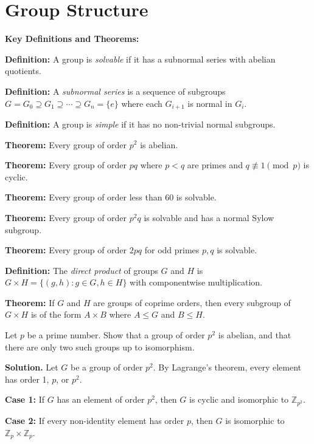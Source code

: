 \section{Group Structure}

\textbf{Key Definitions and Theorems:}

\textbf{Definition:} A group is \textit{solvable} if it has a subnormal series with abelian quotients.

\textbf{Definition:} A \textit{subnormal series} is a sequence of subgroups $G = G_0 \supseteq G_1 \supseteq \cdots \supseteq G_n = \{e\}$ where each $G_{i+1}$ is normal in $G_i$.

\textbf{Definition:} A group is \textit{simple} if it has no non-trivial normal subgroups.

\textbf{Theorem:} Every group of order $p^2$ is abelian.

\textbf{Theorem:} Every group of order $pq$ where $p < q$ are primes and $q \not\equiv 1 \pmod{p}$ is cyclic.

\textbf{Theorem:} Every group of order less than 60 is solvable.

\textbf{Theorem:} Every group of order $p^2q$ is solvable and has a normal Sylow subgroup.

\textbf{Theorem:} Every group of order $2pq$ for odd primes $p, q$ is solvable.

\textbf{Definition:} The \textit{direct product} of groups $G$ and $H$ is $G \times H = \{(g,h) : g \in G, h \in H\}$ with componentwise multiplication.

\textbf{Theorem:} If $G$ and $H$ are groups of coprime orders, then every subgroup of $G \times H$ is of the form $A \times B$ where $A \leq G$ and $B \leq H$.

\begin{problembox}
Let $p$ be a prime number. Show that a group of order $p^2$ is abelian, and that there are only two such groups up to isomorphism.
\end{problembox}

\noindent\textbf{Solution.} Let $G$ be a group of order $p^2$. By Lagrange's theorem, every element has order 1, $p$, or $p^2$.

\textbf{Case 1:} If $G$ has an element of order $p^2$, then $G$ is cyclic and isomorphic to $\mathbb{Z}_{p^2}$.

\textbf{Case 2:} If every non-identity element has order $p$, then $G$ is isomorphic to $\mathbb{Z}_p \times \mathbb{Z}_p$.


